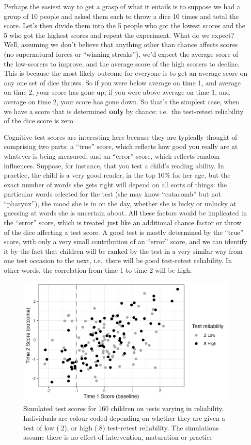 \documentclass{krantz}
\begin{document}
Perhaps the easiest way to get a grasp of what it entails is to suppose we had a group of 10 people and asked them each to throw a dice 10 times and total the score. Let's then divide them into the 5 people who got the lowest scores and the 5 who got the highest scores and repeat the experiment. What do we expect? Well, assuming we don't believe that anything other than chance affects scores (no supernatural forces or ``winning streaks''), we'd expect the average score of the low-scorers to improve, and the average score of the high scorers to decline. This is because the most likely outcome for everyone is to get an average score on any one set of dice throws. So if you were below average on time 1, and average on time 2, your score has gone up; if you were above average on time 1, and average on time 2, your score has gone down. So that's the simplest case, when we have a score that is determined \textbf{only} by chance: i.e.~the test-retest reliability of the dice score is zero.

Cognitive test scores are interesting here because they are typically thought of comprising two parts: a ``true'' score, which reflects how good you really are at whatever is being measured, and an ``error'' score, which reflects random influences. Suppose, for instance, that you test a child's reading ability. In practice, the child is a very good reader, in the top 10\% for her age, but the exact number of words she gets right will depend on all sorts of things: the particular words selected for the test (she may know ``catacomb'' but not ``pharynx''), the mood she is in on the day, whether she is lucky or unlucky at guessing at words she is uncertain about. All these factors would be implicated in the ``error'' score, which is treated just like an additional chance factor or throw of the dice affecting a test score. A good test is mostly determined by the ``true'' score, with only a very small contribution of an ``error'' score, and we can identify it by the fact that children will be ranked by the test in a very similar way from one test occasion to the next, i.e.~there will be good test-retest reliability. In other words, the correlation from time 1 to time 2 will be high.

\begin{figure}
\includegraphics[width=0.75\linewidth]{images_bw/reg2mean} \caption{Simulated test scores for 160 children on tests varying in reliability. Individuals are colour-coded depending on whether they are given a test of low (.2), or high (.8) test-retest reliability. The simulations assume there is no effect of intervention, maturation or practice}\label{fig:reg2mean}
\end{figure}
\end{document}
